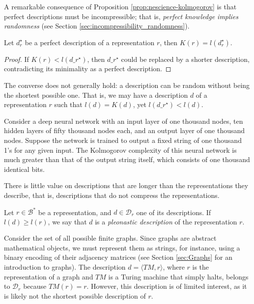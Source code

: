 A remarkable consequence of Proposition \ref{prop:nescience-kolmogorov} is that perfect descriptions must be incompressible; that is, \emph{perfect knowledge implies randomness} (see Section \ref{sec:incompressibility_randomness}).

\begin{corollary}
Let $d_r^{\star}$ be a perfect description of a representation $r$, then $K(r) = l \left( d_r^{\star} \right)$.
\end{corollary}
\begin{proof}
If $K(r) < l \left( d\_r^{\star} \right)$, then $d\_r^{\star}$ could be replaced by a shorter description, contradicting its minimality as a perfect description.
\end{proof}

The converse does not generally hold: a description can be random without being the shortest possible one. That is, we may have a description $d$ of a representation $r$ such that $l(d) = K(d)$, yet $l(d\_r^{\star}) < l(d)$.

\begin{example}
\label{ex:description_neural}
Consider a deep neural network with an input layer of one thousand nodes, ten hidden layers of fifty thousand nodes each, and an output layer of one thousand nodes. Suppose the network is trained to output a fixed string of one thousand 1's for any given input. The Kolmogorov complexity of this neural network is much greater than that of the output string itself, which consists of one thousand identical bits.
\end{example}

There is little value on descriptions that are longer than the representations they describe, that is, descriptions that do not compress the representations.

\begin{definition}
\label{def:trivial_model}
Let $r \in \mathcal{B}^\ast$ be a representation, and $d \in \mathcal{D}_r$ one of its descriptions. If $l(d) \geq l(r)$, we say that $d$ is a \emph{pleonastic description} of the representation $r$.
\end{definition}

\begin{example}
\label{ex:topics_models_graph}
Consider the set of all possible finite graphs. Since graphs are abstract mathematical objects, we must represent them as strings, for instance, using a binary encoding of their adjacency matrices (see Section \ref{sec:Graphs} for an introduction to graphs). The description $d = \langle TM, r \rangle$, where $r$ is the representation of a graph and $TM$ is a Turing machine that simply halts, belongs to $\mathcal{D}_r$ because $TM(r) = r$. However, this description is of limited interest, as it is likely not the shortest possible description of $r$.
\end{example}

